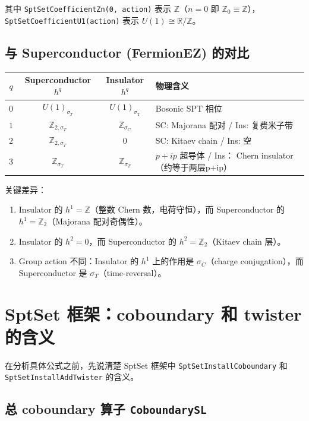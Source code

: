 \documentclass[a4paper,fontset=ubuntu,12pt]{ctexart}
\newcommand{\ZZ}{\mathbb{Z}}
\newcommand{\aT}{\sigma_T}
\newcommand{\aC}{\sigma_C}
\begin{document}
其中 \texttt{SptSetCoefficientZn(0, action)} 表示 $\ZZ$（$n = 0$ 即 $\ZZ_0 \equiv \ZZ$），
\texttt{SptSetCoefficientU1(action)} 表示 $U(1) \cong \mathbb{R}/\ZZ$。

\subsection{与 Superconductor (FermionEZ) 的对比}

\begin{center}
\begin{tabular}{c|cc|l}
\hline
$q$ & Superconductor $h^q$ & Insulator $h^q$ & 物理含义 \\
\hline
$0$ & $U(1)_{\aT}$ & $U(1)_{\aT}$ & Bosonic SPT 相位 \\
$1$ & $\ZZ_{2,\aT}$ & $\ZZ_{\aC}$ & SC: Majorana 配对 / Ins: 复费米子带 \\
$2$ & $\ZZ_{2,\aT}$ & $0$ & SC: Kitaev chain / Ins: 空 \\
$3$ & $\ZZ_{\aT}$ & $\ZZ_{\aT}$ & $p + ip$ 超导体 / Ins： Chern insulator（约等于两层p+ip） \\
\hline
\end{tabular}
\end{center}

关键差异：
\begin{enumerate}
\item Insulator 的 $h^1 = \ZZ$（整数 Chern 数，电荷守恒），而 Superconductor 的 $h^1 = \ZZ_2$（Majorana 配对奇偶性）。
\item Insulator 的 $h^2 = 0$，而 Superconductor 的 $h^2 = \ZZ_2$（Kitaev chain 层）。
\item Group action 不同：Insulator 的 $h^1$ 上的作用是 $\aC$（charge conjugation），而 Superconductor 是 $\aT$（time-reversal）。
\end{enumerate}

\section{SptSet 框架：coboundary 和 twister 的含义}
\label{sec:framework}

在分析具体公式之前，先说清楚 SptSet 框架中 \texttt{SptSetInstallCoboundary} 和 \texttt{SptSetInstallAddTwister} 的含义。

\subsection{总 coboundary 算子 \texttt{CoboundarySL}}
\end{document}
